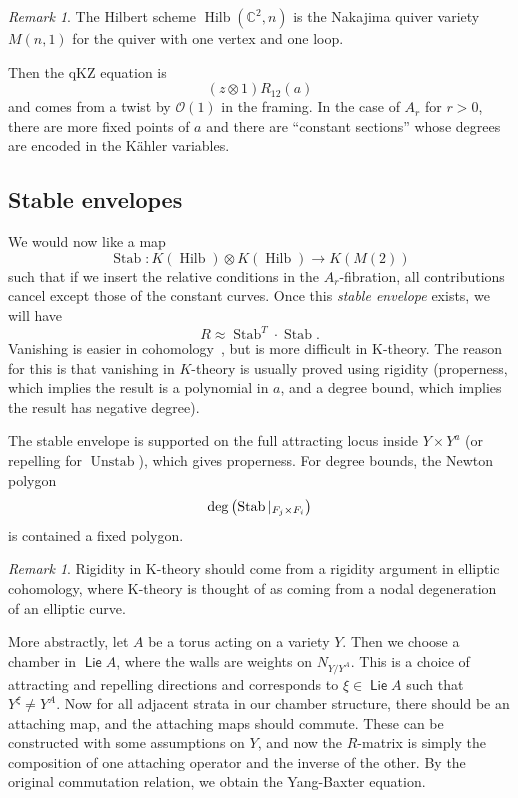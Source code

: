 \documentclass[leqno, openany]{memoir}
\theoremstyle{definition}
\theoremstyle{remark}
\newtheorem{rmk}[thm]{Remark}
\theoremstyle{plain}
\theoremstyle{definition}
\theoremstyle{remark}
\newcommand{\C}{\mathbb{C}}
\newcommand{\mc}[1]{\mathcal{#1}}
\newcommand{\ms}[1]{\mathsf{#1}}
\newcommand{\on}[1]{\operatorname{#1}}
\DeclareMathOperator{\Hilb}{Hilb}
\begin{document}
\begin{rmk}
    The Hilbert scheme $\Hilb(\C^2, n)$ is the Nakajima quiver variety $M(n,1)$ for the quiver with one vertex and one loop.
\end{rmk}

Then the qKZ equation is
\[ (z \otimes 1)R_{12}(a) \]
and comes from a twist by $\mc{O}(1)$ in the framing. In the case of $A_r$ for $r > 0$, there are more fixed points of $a$ and there are ``constant sections'' whose degrees are encoded in the K\"ahler variables.

\subsection{Stable envelopes}

We would now like a map
\[ \on{Stab} \colon K(\Hilb) \otimes K(\Hilb) \to K(M(2)) \]
such that if we insert the relative conditions in the $A_r$-fibration, all contributions cancel except those of the constant curves. Once this \textit{stable envelope} exists, we will have
\[ R \approx \on{Stab}^T \cdot \on{Stab}. \]
Vanishing is easier in cohomology~\cite{qgqc}, but is more difficult in K-theory. The reason for this is that vanishing in $K$-theory is usually proved using rigidity (properness, which implies the result is a polynomial in $a$, and a degree bound, which implies the result has negative degree).

The stable envelope is supported on the full attracting locus inside $Y \times Y^a$ (or repelling for $\on{Unstab}$), which gives properness. For degree bounds, the Newton polygon
\[ \deg\qty(\on{Stab}|_{F_j \times F_i}) \]
is contained a fixed polygon.

\begin{rmk}
    Rigidity in K-theory should come from a rigidity argument in elliptic cohomology, where K-theory is thought of as coming from a nodal degeneration of an elliptic curve.
\end{rmk}

More abstractly, let $A$ be a torus acting on a variety $Y$. Then we choose a chamber in $\on{\ms{Lie}} A$, where the walls are weights on $N_{Y/Y^A}$. This is a choice of attracting and repelling directions and corresponds to $\xi \in \on{\ms{Lie}} A$ such that $Y^{\xi} \neq Y^A$. Now for all adjacent strata in our chamber structure, there should be an attaching map, and the attaching maps should commute. These can be constructed with some assumptions on $Y$, and now the $R$-matrix is simply the composition of one attaching operator and the inverse of the other. By the original commutation relation, we obtain the Yang-Baxter equation.
\end{document}
